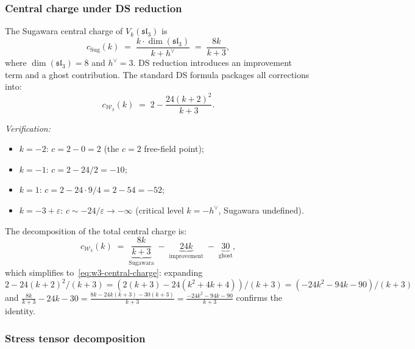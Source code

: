 \subsubsection{Central charge under DS reduction}

\begin{computation}
\label{comp:w3-central-charge}
%
The Sugawara central charge of $V_k(\mathfrak{sl}_3)$ is
\[
c_{\mathrm{Sug}}(k)
\;=\; \frac{k \cdot \dim(\mathfrak{sl}_3)}{k + h^\vee}
\;=\; \frac{8k}{k + 3},
\]
where $\dim(\mathfrak{sl}_3) = 8$ and $h^\vee = 3$.
DS reduction introduces an improvement term and a
ghost contribution. The standard DS formula packages all
corrections into:
\begin{equation}
\label{eq:w3-central-charge}
c_{\mathcal{W}_3}(k)
\;=\; 2 - \frac{24(k+2)^2}{k+3}.
\end{equation}

\emph{Verification:}
\begin{itemize}
\item $k = -2$: $c = 2 - 0 = 2$ (the $c = 2$ free-field point);
\item $k = -1$: $c = 2 - 24/2 = -10$;
\item $k = 1$: $c = 2 - 24 \cdot 9/4 = 2 - 54 = -52$;
\item $k = -3 + \varepsilon$: $c \sim -24/\varepsilon \to -\infty$
 (critical level $k = -h^\vee$, Sugawara undefined).
\end{itemize}

The decomposition of the total central charge is:
\begin{equation}
\label{eq:w3-cc-decomposition}
c_{\mathcal{W}_3}(k)
\;=\;
\underbrace{\frac{8k}{k+3}}_{\text{Sugawara}}
\;-\;
\underbrace{24k}_{\text{improvement}}
\;-\;
\underbrace{30}_{\text{ghost}},
\end{equation}
which simplifies to~\eqref{eq:w3-central-charge}: expanding
$2 - 24(k+2)^2/(k+3)
= (2(k+3) - 24(k^2+4k+4))/(k+3)
= (-24k^2 - 94k - 90)/(k+3)$
and $\frac{8k}{k+3} - 24k - 30
= \frac{8k - 24k(k+3) - 30(k+3)}{k+3}
= \frac{-24k^2 - 94k - 90}{k+3}$
confirms the identity.
\end{computation}

\subsubsection{Stress tensor decomposition}

